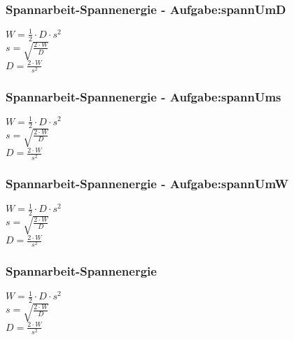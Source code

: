 \subsubsection{Spannarbeit-Spannenergie - Aufgabe:spannUmD} 
\begin{minipage}{0.45\textwidth} 
$ W =\frac{1}{2}\cdot D\cdot s^{2} $\\ 
$ s = \sqrt{\frac{2\cdot W}{ D}} $\\ 
$ D =\frac{2\cdot W}{s^{2} } $\\ 
\end{minipage} 
\begin{minipage}{0.45\textwidth} 
 
\end{minipage} 
\subsubsection{Spannarbeit-Spannenergie - Aufgabe:spannUms} 
\begin{minipage}{0.45\textwidth} 
$ W =\frac{1}{2}\cdot D\cdot s^{2} $\\ 
$ s = \sqrt{\frac{2\cdot W}{ D}} $\\ 
$ D =\frac{2\cdot W}{s^{2} } $\\ 
\end{minipage} 
\begin{minipage}{0.45\textwidth} 
 
\end{minipage} 
\subsubsection{Spannarbeit-Spannenergie - Aufgabe:spannUmW} 
\begin{minipage}{0.45\textwidth} 
$ W =\frac{1}{2}\cdot D\cdot s^{2} $\\ 
$ s = \sqrt{\frac{2\cdot W}{ D}} $\\ 
$ D =\frac{2\cdot W}{s^{2} } $\\ 
\end{minipage} 
\begin{minipage}{0.45\textwidth} 
 
\end{minipage} 
\subsubsection{Spannarbeit-Spannenergie} 
\begin{minipage}{0.45\textwidth} 
$ W =\frac{1}{2}\cdot D\cdot s^{2} $\\ 
$ s = \sqrt{\frac{2\cdot W}{ D}} $\\ 
$ D =\frac{2\cdot W}{s^{2} } $\\ 
\end{minipage} 
\begin{minipage}{0.45\textwidth} 
 
\end{minipage} 
